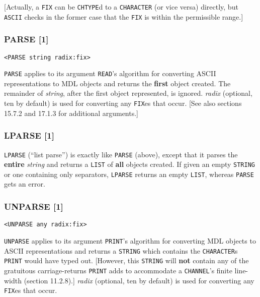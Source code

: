 \documentclass[a4paper]{scrbook}
\begin{document}
{[}Actually, a \texttt{FIX} can be \texttt{CHTYPE}d to a \texttt{CHARACTER} (or vice versa) directly, but \texttt{ASCII}
checks in the former case that the \texttt{FIX} is within the permissible range.{]}

\subsubsection{PARSE {[}1{]}}\label{parse-1}

\begin{verbatim}
<PARSE string radix:fix>
\end{verbatim}

 \texttt{PARSE} applies to its argument \texttt{READ}'s algorithm for converting ASCII
representations to MDL objects and returns the \textbf{first} object created. The remainder of \emph{string}, after the
first object represented, is ignored. \emph{radix} (optional, ten by default) is used for converting any \texttt{FIX}es
that occur. {[}See also sections 15.7.2 and 17.1.3 for additional arguments.{]}

\subsubsection{LPARSE {[}1{]}}\label{lparse-1}

 \texttt{LPARSE} (``list parse'') is exactly like \texttt{PARSE} (above), except that it
parses the \textbf{entire} \emph{string} and returns a \texttt{LIST} of \textbf{all} objects created. If given an empty
\texttt{STRING} or one containing only separators, \texttt{LPARSE} returns an empty \texttt{LIST}, whereas \texttt{PARSE}
gets an error.

\subsubsection{UNPARSE {[}1{]}}\label{unparse-1}

\begin{verbatim}
<UNPARSE any radix:fix>
\end{verbatim}

 \texttt{UNPARSE} applies to its argument \texttt{PRINT}'s algorithm for converting MDL
objects to ASCII representations and returns a \texttt{STRING} which contains the \texttt{CHARACTER}s \texttt{PRINT} would
have typed out. {[}However, this \texttt{STRING} will \textbf{not} contain any of the gratuitous carriage-returns
\texttt{PRINT} adds to accommodate a \texttt{CHANNEL}'s finite line-width (section 11.2.8).{]}
\emph{radix} (optional, ten by default) is used for converting any \texttt{FIX}es that occur.
\end{document}
